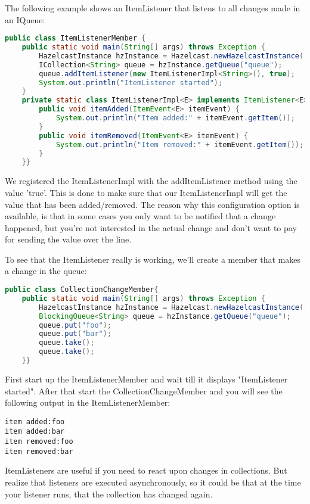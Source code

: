The following example shows an ItemListener that listens to all changes made in an IQueue:
\begin{lstlisting}[language=java]
public class ItemListenerMember {
    public static void main(String[] args) throws Exception {
        HazelcastInstance hzInstance = Hazelcast.newHazelcastInstance();
        ICollection<String> queue = hzInstance.getQueue("queue");
        queue.addItemListener(new ItemListenerImpl<String>(), true);
        System.out.println("ItemListener started");
    }
    private static class ItemListenerImpl<E> implements ItemListener<E> {
        public void itemAdded(ItemEvent<E> itemEvent) {
            System.out.println("Item added:" + itemEvent.getItem());
        }
        public void itemRemoved(ItemEvent<E> itemEvent) {
            System.out.println("Item removed:" + itemEvent.getItem());
        }
    }}
\end{lstlisting}
We registered the ItemListenerImpl with the addItemListener method using the value 'true'. This is done to make sure that our ItemListenerImpl will get the value that has been added/removed. The reason why this configuration option is available, is that in some cases you only want to be notified that a change happened, but you're not interested in the actual change and don't want to pay for sending the value over the line.

To see that the ItemListener really is working, we'll create a member that makes a change in the queue:
\begin{lstlisting}[language=java]
public class CollectionChangeMember{
    public static void main(String[] args) throws Exception {
        HazelcastInstance hzInstance = Hazelcast.newHazelcastInstance();
        BlockingQueue<String> queue = hzInstance.getQueue("queue");
        queue.put("foo");
        queue.put("bar");
        queue.take();
        queue.take();
    }}
\end{lstlisting}
First start up the ItemListenerMember and wait till it displays "ItemListener started". After that start the CollectionChangeMember and you will see the following output in the ItemListenerMember:
\begin{lstlisting}
item added:foo
item added:bar
item removed:foo
item removed:bar
\end{lstlisting}
ItemListeners are useful if you need to react upon changes in collections. But realize that listeners are executed asynchronously, so it could be that at the time your listener runs, that the collection has changed again. 

